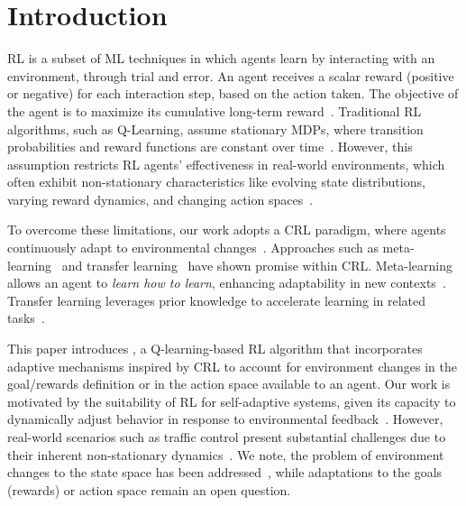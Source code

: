 
\section{Introduction}
\label{sec:introduction}

\acf{RL} is a subset of \ac{ML} techniques in which agents learn by interacting with an environment, 
through trial and error. An agent receives a scalar reward (positive or negative) for each interaction 
step, based on the action taken. The objective of the agent is to maximize its cumulative long-term 
reward~\cite{sutton98}. Traditional \ac{RL} algorithms, such as Q-Learning, assume stationary 
\acp{MDP}, where transition probabilities and reward functions are constant over 
time~\cite{meta-rl-traffic}. However, this assumption restricts \ac{RL} agents' effectiveness in 
real-world environments, which often exhibit non-stationary characteristics like evolving state 
distributions, varying reward dynamics, and changing action 
spaces~\cite{khetarpal2022continualreinforcementlearningreview}.

To overcome these limitations, our work adopts a \acf{CRL} paradigm, where agents continuously 
adapt to environmental changes~\cite{abel2023definitioncontinualreinforcementlearning}. Approaches 
such as meta-learning~\cite{zintgraf21} and transfer learning~\cite{zhuang20} have shown promise 
within \ac{CRL}. Meta-learning allows an agent to \emph{learn how to learn}, enhancing adaptability in 
new contexts~\cite{beck2024surveymetareinforcementlearning}. Transfer learning leverages prior 
knowledge to accelerate learning in related tasks~\cite{chen2022transferredqlearning}.

This paper introduces \adaptiverl, a Q-learning-based \ac{RL} algorithm that incorporates adaptive 
mechanisms inspired by \ac{CRL} to account for environment changes in the goal/rewards definition 
or in the action space available to an agent. Our work is motivated by the suitability of \ac{RL} for 
self-adaptive systems, given its capacity to dynamically adjust behavior in response to environmental 
feedback~\cite{HENRICHS2022106940}. However, real-world scenarios such as traffic control 
present substantial challenges due to their inherent non-stationary dynamics~\cite{meta-rl-traffic}. 
We note, the problem of environment changes to the state space has been addressed~\cite{gueriau19}, 
while adaptations to the goals (\ie rewards) or action space remain an open question.


